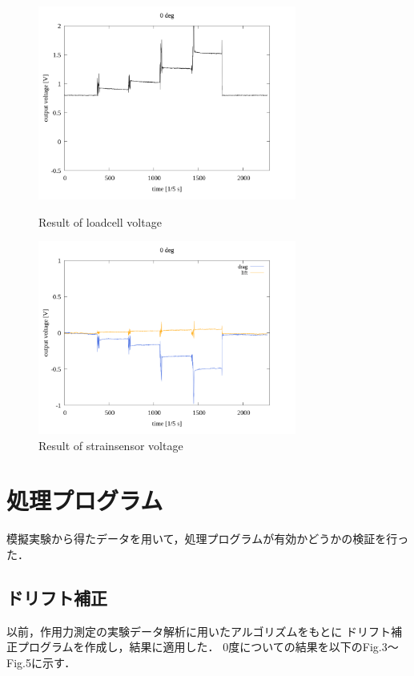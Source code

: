 \documentclass[twocolumn,a4j]{jsarticle}
\begin{document}
\begin{figure}[htbp]
    \footnotesize
    \begin{center}
        \includegraphics[width=85mm]{../images/reverse/0_loadcell.png}
        \caption{Result of loadcell voltage}
        \includegraphics[width=85mm]{../images/reverse/0_strainsensor.png}
        \caption{Result of strainsensor voltage}
    \end{center}
\end{figure}

\section{処理プログラム}
模擬実験から得たデータを用いて，処理プログラムが有効かどうかの検証を行った．

\subsection{ドリフト補正}
以前，作用力測定の実験データ解析に用いたアルゴリズムをもとに
ドリフト補正プログラムを作成し，結果に適用した．
0度についての結果を以下のFig.3～Fig.5に示す．
\end{document}
